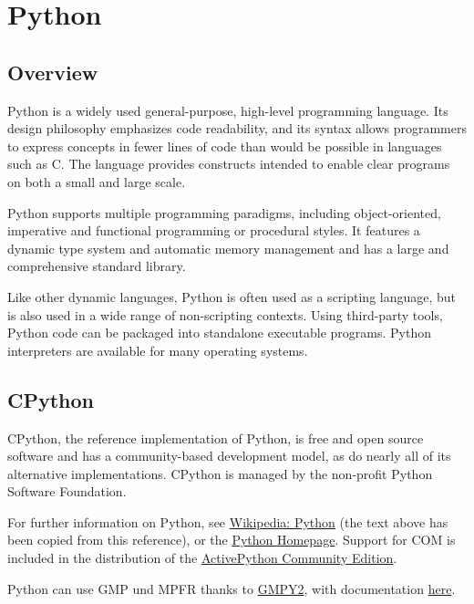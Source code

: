 
\chapter{Python} 

\section{Overview}
Python is a widely used general-purpose, high-level programming language. Its design philosophy emphasizes code readability, and its syntax allows programmers to express concepts in fewer lines of code than would be possible in languages such as C. The language provides constructs intended to enable clear programs on both a small and large scale.

\vpara
Python supports multiple programming paradigms, including object-oriented, imperative and functional programming or procedural styles. It features a dynamic type system and automatic memory management and has a large and comprehensive standard library.

\vpara
Like other dynamic languages, Python is often used as a scripting language, but is also used in a wide range of non-scripting contexts. Using third-party tools, Python code can be packaged into standalone executable programs. Python interpreters are available for many operating systems.




\newpage
\section{CPython}

CPython, the reference implementation of Python, is free and open source software and has a community-based development model, as do nearly all of its alternative implementations. CPython is managed by the non-profit Python Software Foundation.

\vpara
For further information on Python, see \href{http://en.wikipedia.org/wiki/Python_(programming_language)}{Wikipedia: Python} (the text above has been copied from this reference), or the  \href{http://www.python.org/}{Python Homepage}. Support for COM is included in the distribution of the \href{http://www.activestate.com/activepython/downloads}{ActivePython Community Edition}.

\vpara
Python can use  GMP und MPFR thanks to \href{http://code.google.com/p/gmpy/}{GMPY2}, with documentation \href{https://gmpy2.readthedocs.org/en/latest/}{here}.


